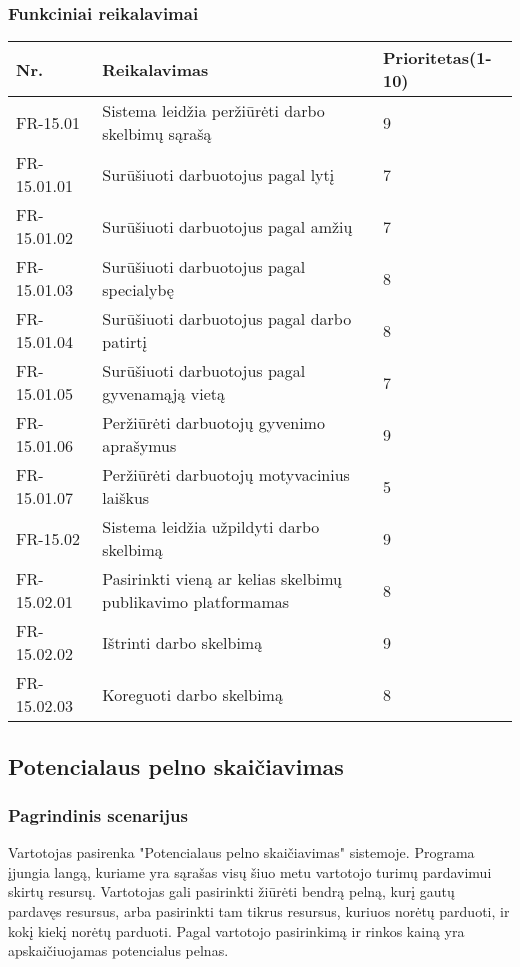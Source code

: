 \documentclass[oneside]{VUMIFPSkursinis}
\begin{document}
	\subsubsection{Funkciniai reikalavimai}
\begin{table}[htbp]
	\begin{tabularx}{1\textwidth}{ |P{2.5cm}|X|P{3cm }| }  \hline
		Nr. & Reikalavimas & Prioritetas(1-10) \\ \hline
		FR-15.01 & Sistema leidžia peržiūrėti darbo skelbimų sąrašą & 9 \\ \hline
		FR-15.01.01 & Surūšiuoti darbuotojus pagal lytį & 7 \\ \hline
		FR-15.01.02 & Surūšiuoti darbuotojus pagal amžių & 7 \\ \hline
		FR-15.01.03 & Surūšiuoti darbuotojus pagal specialybę & 8  \\ \hline
		FR-15.01.04 & Surūšiuoti darbuotojus pagal darbo patirtį & 8 \\ \hline
		FR-15.01.05 & Surūšiuoti darbuotojus pagal gyvenamąją vietą & 7 \\ \hline
		FR-15.01.06 & Peržiūrėti darbuotojų gyvenimo aprašymus & 9 \\ \hline
		FR-15.01.07 & Peržiūrėti darbuotojų motyvacinius laiškus & 5 \\ \hline
		FR-15.02 & Sistema leidžia užpildyti darbo skelbimą & 9 \\ \hline
		FR-15.02.01 & Pasirinkti vieną ar kelias skelbimų publikavimo platformamas & 8 \\ \hline
		FR-15.02.02 & Ištrinti darbo skelbimą & 9 \\ \hline
		FR-15.02.03 & Koreguoti darbo skelbimą & 8 \\ \hline
	\end{tabularx}
\end{table}	

\subsection{Potencialaus pelno skaičiavimas}
	\subsubsection{Pagrindinis scenarijus}
	Vartotojas pasirenka "Potencialaus pelno skaičiavimas" sistemoje. Programa įjungia langą, kuriame yra sąrašas visų šiuo metu vartotojo turimų pardavimui skirtų resursų. Vartotojas gali pasirinkti žiūrėti bendrą pelną, kurį gautų pardavęs resursus, arba pasirinkti tam tikrus resursus, kuriuos norėtų parduoti, ir kokį kiekį norėtų parduoti. Pagal vartotojo pasirinkimą ir rinkos kainą yra apskaičiuojamas potencialus pelnas.
\end{document}
